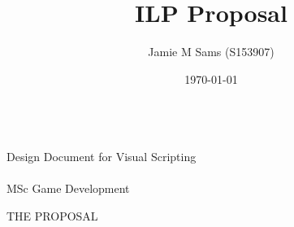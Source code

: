 \documentclass[a4paper, 12pt]{article}
\title{ILP Proposal}
\author{Jamie M Sams (S153907)}
\date{\today}
\begin{document}

\begin{titlepage}
	\vspace*{\fill}
	\centering
	{\huge \thetitle}\\[.5cm]
	{\Large Design Document for Visual Scripting}\\[.5cm]
	{\large \theauthor}\\[.5cm]
	{MSc Game Development}
	\vspace*{\fill}
\end{titlepage}

\lhead{\theauthor}

THE PROPOSAL
\end{document}
